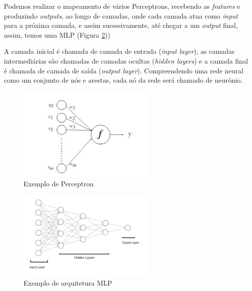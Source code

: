 Podemos realizar o mapeamento de vários Perceptrons, recebendo as \textit{features} e produzindo \textit{outputs}, ao longo de camadas, onde cada camada atua como \textit{input} para a próxima camada, e assim sucessivamente, até chegar a
 um \textit{output} final, assim, temos uma \acrshort{MLP} (Figura \ref{fig:mlp}))
 
 
 A camada inicial é chamada de camada de entrada (\textit{input layer}), as camadas intermediárias são chamadas de camadas ocultas (\textit{hidden layers}) e a camada final é chamada de camada de saída (\textit{output layer}). Compreendendo uma rede neural como um conjunto de nós e arestas, cada nó da rede será chamado de neurônio.

\begin{figure}[!ht]
\centering
\includegraphics[width=0.6\textwidth]{img/perceptron.png}
\caption{\label{fig:perceptron}Exemplo de Perceptron}
\author{Fonte: Retirado de~\cite{12}}
\end{figure}

\begin{figure}[!h]
\centering
\includegraphics[width=0.6\textwidth]{img/mlp02.png}
\caption{\label{fig:mlp}Exemplo de arquitetura \acrshort{MLP}}

\end{figure}

